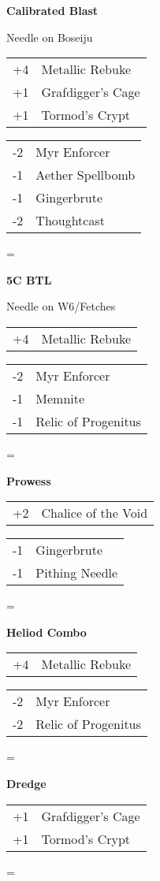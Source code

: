 \documentclass[fontsize=12pt,paper=a4]{scrartcl}
\newenvironment{absolutelynopagebreak}
  {\par\nobreak\vfil\penalty0\vfilneg
   \vtop\bgroup}
  {\par\xdef\tpd{\the\prevdepth}\egroup
   \prevdepth=\tpd}
\newenvironment{decklist}{%
    \begin{tabular}{>{\hspace{-4pt}}r<{\hspace{-3pt}}>{\hspace{-3pt}}l<{\hspace{-4pt}}}
    }{%
    \end{tabular}
    \par
}
\newcommand{\card}[2]{#1 & #2\\}
\newenvironment{sideboardguide}{%
    \newpage
    \begin{multicols}{4}
        \begin{tiny}
        }{%
        \end{tiny}
    \end{multicols}
}
\newenvironment{matchup}[1]{%
    \begin{absolutelynopagebreak}
        \textbf{#1}\par
    }{%
    \end{absolutelynopagebreak}
    \par\vspace{2em}
}
\newenvironment{notes}{%
}{%
    \par
}
\begin{document}
\begin{sideboardguide}
\begin{matchup}{Calibrated Blast}
        \begin{notes}
            Needle on Boseiju
        \end{notes}
        \begin{decklist}
            \card{+4}{Metallic Rebuke}
            \card{+1}{Grafdigger's Cage}
            \card{+1}{Tormod's Crypt}
        \end{decklist}
        \begin{decklist}
            \card{-2}{Myr Enforcer}
            \card{-1}{Aether Spellbomb}
            \card{-1}{Gingerbrute}
            \card{-2}{Thoughtcast}
        \end{decklist}
    \end{matchup}
    \begin{matchup}{5C BTL}
        \begin{notes}
            Needle on W6/Fetches
        \end{notes}
        \begin{decklist}
            \card{+4}{Metallic Rebuke}
        \end{decklist}
        \begin{decklist}
            \card{-2}{Myr Enforcer}
            \card{-1}{Memnite}
            \card{-1}{Relic of Progenitus}
        \end{decklist}
    \end{matchup}
    \begin{matchup}{Prowess}
        \begin{decklist}
            \card{+2}{Chalice of the Void}
        \end{decklist}
        \begin{decklist}
            \card{-1}{Gingerbrute}
            \card{-1}{Pithing Needle}
        \end{decklist}
    \end{matchup}
    \begin{matchup}{Heliod Combo}
        \begin{decklist}
            \card{+4}{Metallic Rebuke}
        \end{decklist}
        \begin{decklist}
            \card{-2}{Myr Enforcer}
            \card{-2}{Relic of Progenitus}
        \end{decklist}
    \end{matchup}
    \begin{matchup}{Dredge}
        \begin{decklist}
            \card{+1}{Grafdigger's Cage}
            \card{+1}{Tormod's Crypt}

\end{decklist}
\end{matchup}
\end{sideboardguide}
\end{document}
